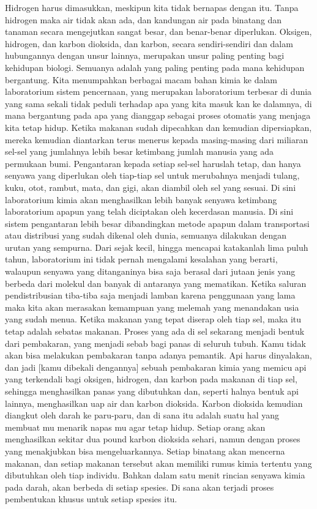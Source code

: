 \documentclass[]{article}
\begin{document}
Hidrogen harus dimasukkan, meskipun kita tidak bernapas dengan itu. Tanpa hidrogen maka air tidak akan ada, dan kandungan air pada binatang dan tanaman secara mengejutkan sangat besar, dan benar-benar diperlukan. Oksigen, hidrogen, dan karbon dioksida, dan karbon, secara sendiri-sendiri dan dalam hubungannya dengan unsur lainnya, merupakan unsur paling penting bagi kehidupan biologi. Semuanya adalah yang paling penting pada mana kehidupan bergantung. 
Kita menumpahkan berbagai macam bahan kimia ke dalam laboratorium sistem pencernaan, yang merupakan laboratorium terbesar di dunia yang sama sekali tidak peduli terhadap apa yang kita masuk kan ke dalamnya, di mana bergantung pada apa yang dianggap sebagai proses otomatis yang menjaga kita tetap hidup. Ketika makanan sudah dipecahkan dan kemudian dipersiapkan, mereka kemudian diantarkan terus menerus kepada masing-masing dari miliaran sel-sel yang jumlahnya lebih besar ketimbang jumlah manusia yang ada permukaan bumi. Pengantaran kepada setiap sel-sel haruslah tetap, dan hanya senyawa yang diperlukan oleh tiap-tiap sel untuk merubahnya menjadi tulang, kuku, otot, rambut, mata, dan gigi, akan diambil oleh sel yang sesuai. Di sini laboratorium kimia akan menghasilkan lebih banyak senyawa ketimbang laboratorium apapun yang telah diciptakan oleh kecerdasan manusia. Di sini sistem pengantaran lebih besar dibandingkan metode apapun dalam transportasi atau distribusi yang sudah dikenal oleh dunia, semuanya dilakukan dengan urutan yang sempurna. Dari sejak kecil, hingga mencapai katakanlah lima puluh tahun, laboratorium ini tidak pernah mengalami kesalahan yang berarti, walaupun senyawa yang ditanganinya bisa saja berasal dari jutaan jenis yang berbeda dari molekul dan banyak di antaranya yang mematikan. Ketika saluran pendistribusian tiba-tiba saja menjadi lamban karena penggunaan yang lama maka kita akan merasakan kemampuan yang melemah  yang menandakan usia yang sudah menua. 
Ketika makanan yang tepat diserap oleh tiap sel, maka itu tetap adalah sebatas makanan. Proses yang ada di sel sekarang menjadi bentuk dari pembakaran, yang menjadi sebab bagi panas di seluruh tubuh. Kamu tidak akan bisa melakukan pembakaran tanpa adanya pemantik. Api harus dinyalakan,  dan jadi [kamu dibekali dengannya] sebuah pembakaran kimia yang memicu api yang terkendali bagi oksigen, hidrogen, dan karbon pada makanan di tiap sel, sehingga menghasilkan panas yang dibutuhkan dan, seperti halnya bentuk api lainnya, menghasilkan uap air dan karbon dioksida. Karbon dioksida kemudian diangkut oleh darah ke paru-paru, dan di sana itu adalah suatu hal yang membuat mu menarik napas mu agar tetap hidup. Setiap  orang akan menghasilkan sekitar dua pound karbon dioksida sehari, namun dengan proses yang menakjubkan bisa mengeluarkannya. Setiap binatang akan mencerna makanan, dan setiap makanan tersebut akan memiliki rumus kimia tertentu yang dibutuhkan oleh tiap individu. Bahkan dalam satu menit rincian senyawa kimia pada darah, akan berbeda di setiap spesies. Di sana akan terjadi proses pembentukan khusus untuk setiap spesies itu. 
\end{document}
